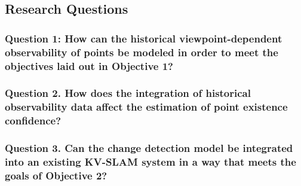 \subsection{Research Questions}

\subsubsection*{Question 1: How can the historical viewpoint-dependent observability of points be modeled in order to meet the objectives laid out in Objective 1?}

\subsubsection*{Question 2. How does the integration of historical observability data affect the estimation of point existence confidence?}



\subsubsection*{Question 3. Can the change detection model be integrated into an existing KV-SLAM system in a way that meets the goals of Objective 2?}